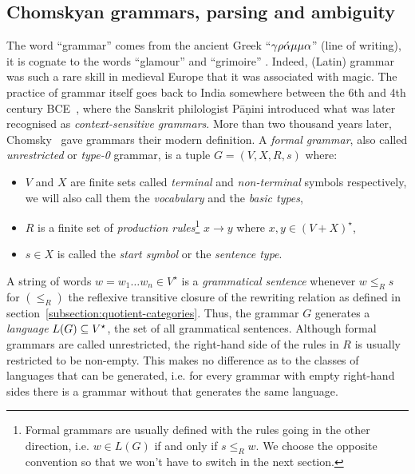 
\subsection{Chomskyan grammars, parsing and ambiguity}\label{subsection:chomsky}

The word ``grammar'' comes from the ancient Greek ``$\rm{\gamma \rho\acute{\alpha}\mu\mu\alpha}$'' (line of writing), it is cognate to the words ``glamour'' and ``grimoire'' \cite{RuppliThorel05, Davies10, Lambek14}.
Indeed, (Latin) grammar was such a rare skill in medieval Europe that it was associated with magic.
The practice of grammar itself goes back to India somewhere between the 6th and 4th century BCE~\cite{BhateKak93}, where the Sanskrit philologist P\={a}\d{n}ini introduced what was later recognised as \emph{context-sensitive grammars}.
More than two thousand years later, Chomsky~\cite{Chomsky56,Chomsky57} gave grammars their modern definition.
A \emph{formal grammar}, also called \emph{unrestricted} or \emph{type-0} grammar, is a tuple $G = (V, X, R, s)$ where:
\begin{itemize}
    \item $V$ and $X$ are finite sets called \emph{terminal} and \emph{non-terminal} symbols respectively, we will also call them the \emph{vocabulary} and the \emph{basic types},
    \item $R$ is a finite set of \emph{production rules}\footnote
    {Formal grammars are usually defined with the rules going in the other direction, i.e. $w \in L(G)$ if and only if $s \leq_R w$.
    We choose the opposite convention so that we won't have to switch in the next section.} $x \to y$ where $x, y \in (V + X)^\star$,
    \item $s \in X$ is called the \emph{start symbol} or the \emph{sentence type}.
\end{itemize}
A string of words $w = w_1 \dots w_n \in V^\star$ is a \emph{grammatical sentence} whenever $w \leq_R s$
for $(\leq_R)$ the reflexive transitive closure of the rewriting relation as defined in section~\ref{subsection:quotient-categories}.
Thus, the grammar $G$ generates a \emph{language} $L(G) \subseteq V^\star$, the set of all grammatical sentences.
Although formal grammars are called unrestricted, the right-hand side of the rules in $R$ is usually restricted to be non-empty.
This makes no difference as to the classes of languages that can be generated, i.e. for every grammar with empty right-hand sides there is a grammar without that generates the same language.

